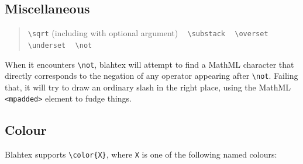 \documentclass{article}
\newcommand{\texcommand}[1]{\textbackslash{}#1}
\newcommand{\spacer}{\,\,\, \hfil}
\newcommand{\lastspacer}{\hfill\hfill\hfill}
\newenvironment{mylist}{\begin{quote}}{\end{quote}}
\begin{document}
\subsection{Miscellaneous}

\begin{mylist}
\texttt{\texcommand{sqrt}} (including with optional argument) \spacer
\texttt{\texcommand{substack}} \spacer
\texttt{\texcommand{overset}} \spacer
\texttt{\texcommand{underset}} \spacer
\texttt{\texcommand{not}} \lastspacer
\end{mylist}

When it encounters \texttt{\texcommand{not}}, blahtex will attempt to find a MathML character that directly corresponds to the negation of any operator appearing after \texttt{\texcommand{not}}. Failing that, it will try to draw an ordinary slash in the right place, using the MathML \texttt{<mpadded>} element to fudge things.

\subsection{Colour}

Blahtex supports \texttt{\texcommand{color}\{X\}}, where \texttt{X} is one of the following named colours:
\end{document}
